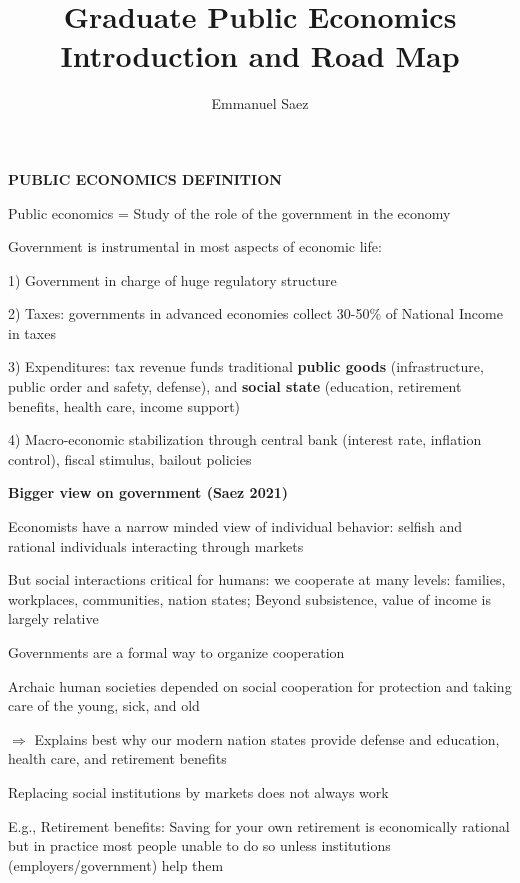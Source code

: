 \documentclass[landscape]{slides}
\author{Emmanuel Saez}
\date{}
\title{Graduate Public Economics \\
Introduction and Road Map } \onlyslides{1-300}
\begin{document}
\begin{slide}
\maketitle
\end{slide}

\begin{slide}
\begin{center}
{\bf PUBLIC ECONOMICS DEFINITION}
\end{center}
Public economics = Study
of the role of the government in the economy

Government is instrumental in most aspects of economic life:

1) Government in charge of huge regulatory structure

2) Taxes: governments in advanced economies collect 30-50\% of National Income in taxes

3) Expenditures: tax revenue funds traditional \textbf{public goods} (infrastructure, public order and safety, defense),
and \textbf{social state} (education, retirement benefits, health care, income support)

4) Macro-economic stabilization through central bank (interest rate, inflation control), fiscal stimulus, bailout policies

\end{slide}

\begin{slide}

\end{slide}

\begin{slide}
\begin{center}
{\bf Bigger view on government (Saez 2021)}
\end{center}
Economists have a narrow minded view of individual behavior: selfish and rational individuals interacting through markets

But social interactions critical for humans:  we cooperate at many levels: families, workplaces, communities, nation states; 
Beyond subsistence, value of income is largely relative

Governments are a formal way to organize cooperation 

Archaic human societies depended on social cooperation for protection and taking care of the young, sick, and old

$\Rightarrow$ Explains best why our modern nation states provide defense and education, health care, and retirement benefits

Replacing social institutions by markets does not always work  

\small E.g., Retirement benefits: Saving for your own retirement is economically rational but in practice most people unable to do so unless institutions (employers/government) help them 


\end{slide}
\end{document}
